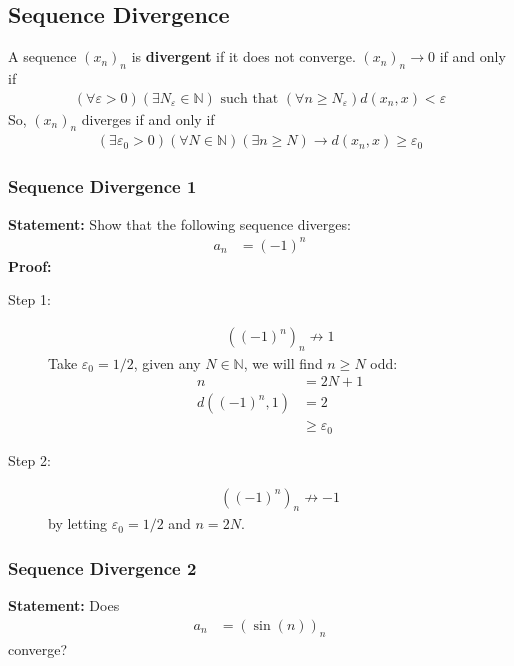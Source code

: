 \documentclass[10pt]{extarticle}
\newcommand{\N}{\mathbb{N}}
\begin{document}
  \subsection{Sequence Divergence}%
    A sequence $(x_n)_n$ is \textbf{divergent} if it does not converge. $(x_n)_n \rightarrow 0$ if and only if
    \begin{align*}
      (\forall \varepsilon > 0)(\exists N_{\varepsilon} \in \N) \text{ such that } (\forall n\geq N_{\varepsilon}) d(x_n,x) < \varepsilon
    \end{align*}
    So, $(x_n)_n$ diverges if and only if
    \begin{align*}
      (\exists \varepsilon_0 > 0)(\forall N\in\N) (\exists n\geq N) \rightarrow d(x_n,x)\geq \varepsilon_0
    \end{align*}
    \subsubsection{Sequence Divergence 1}%
    \textbf{Statement:} Show that the following sequence diverges:
      \begin{align*}
        a_n &= (-1)^n
      \end{align*}
      \textbf{Proof:}
      \begin{description}
        \item[Step 1:]
          \begin{align*}
            \left((-1)^n\right)_n \not\rightarrow 1
          \end{align*}
          Take $\varepsilon_0 = 1/2$, given any $N\in\N$, we will find $n\geq N$ odd:
          \begin{align*}
            n &= 2N+1\\
            d((-1)^n,1) &= 2\\
                        &\geq \varepsilon_0
          \end{align*}
        \item[Step 2:]
          \begin{align*}
            \left((-1)^n\right)_n \not\rightarrow -1
          \end{align*}
          by letting $\varepsilon_0 = 1/2$ and $n = 2N$.
      \end{description}
      \subsubsection{Sequence Divergence 2}%
      \textbf{Statement:} Does
      \begin{align*}
        a_n &= \left(\sin(n)\right)_n
      \end{align*}
      converge?\\
\end{document}
